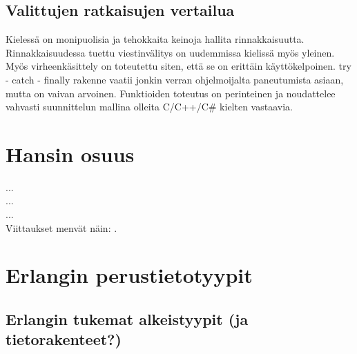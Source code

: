\documentclass[11pt,oneside,a4paper]{article}
\begin{document}
\subsection{Valittujen ratkaisujen vertailua}
Kielessä on monipuolisia ja tehokkaita keinoja hallita rinnakkaisuutta.
Rinnakkaisuudessa tuettu viestinvälitys on uudemmissa kielissä myös yleinen.
Myös virheenkäsittely on toteutettu siten, että se on erittäin käyttökelpoinen.
try - catch - finally rakenne vaatii jonkin verran ohjelmoijalta paneutumista
asiaan, mutta on vaivan arvoinen. Funktioiden toteutus on perinteinen ja
noudattelee vahvasti suunnittelun mallina olleita C/C++/C\# kielten vastaavia. 

\section{Hansin osuus}
... \\
... \\
... \\

Viittaukset menvät näin: \cite{ERL99}.

\section{Erlangin perustietotyypit}

\subsection{Erlangin tukemat alkeistyypit (ja tietorakenteet?)}
\end{document}
